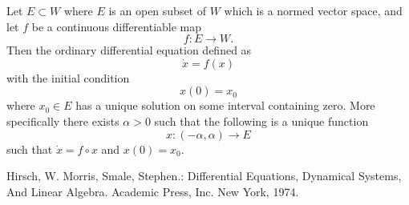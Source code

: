 \documentclass[12pt]{article}
\begin{document}
Let $E\subset W$ where $E$ is an open subset of $W$ which is a normed vector space, and let $f$ be a continuous differentiable map
$$f: E \to W.$$  Then the ordinary differential equation defined as 
$$\dot{x} = f(x)$$
with the initial condition
$$x(0) = x_0$$
where $x_0 \in E$ has a unique solution on some interval containing zero.  More specifically there exists $\alpha>0$ such that the following is a unique function 
$$x:(-\alpha,\alpha) \to E$$
such that $\dot{x}=f\circ x$ and $x(0)=x_0$.\cite{HS}
\begin{thebibliography}{1}
 Hirsch, W. Morris, Smale, Stephen.:  Differential Equations, Dynamical Systems, And Linear Algebra. Academic Press, Inc. New York, 1974. 
\end{thebibliography}
\end{document}

